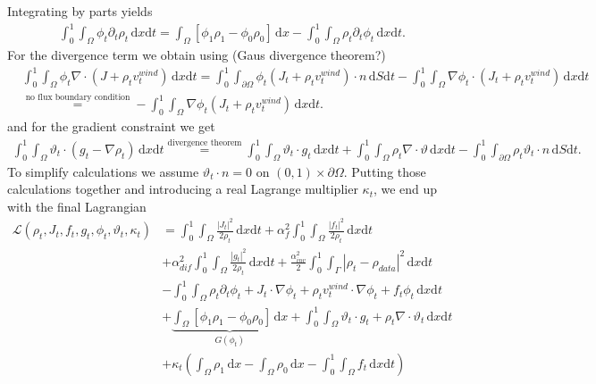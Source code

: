 Integrating by parts yields 
\begin{align*}
	\int_0^1\int_\Omega \phi_t\partial_t\rho_t \,\mathrm{d}x\mathrm{d}t = \int_\Omega[\phi_1\rho_1 - \phi_0\rho_0]\,\mathrm{d}x - \int_0^1\int_\Omega \rho_t\partial_t\phi_t \,\mathrm{d}x\mathrm{d}t.
\end{align*}
For the divergence term we obtain using (Gaus divergence theorem?)
\begin{align*}
	&\int_0^1\int_\Omega \phi_t \nabla \cdot (J + \rho_tv_t^{wind}) \,\mathrm{d}x\mathrm{d}t = \int_0^1\int_{\partial\Omega} \phi_t(J_t + \rho_tv_t^{wind}) \cdot n \,\mathrm{d}S\mathrm{d}t - \int_0^1\int_\Omega \nabla\phi_t \cdot (J_t + \rho_tv_t^{wind}) \,\mathrm{d}x\mathrm{d}t \\&\overset{\text{no flux boundary condition}}{=} - \int_0^1\int_\Omega \nabla\phi_t (J_t + \rho_tv_t^{wind}) \,\mathrm{d}x\mathrm{d}t.
\end{align*}
and for the gradient constraint we get 
\begin{align*}
	\int_0^1\int_\Omega \vartheta_t \cdot (g_t - \nabla\rho_t) \,\mathrm{d}x\mathrm{d}t \overset{\text{divergence theorem}}{=} \int_0^1\int_\Omega \vartheta_t \cdot g_t \,\mathrm{d}x\mathrm{d}t + \int_0^1\int_\Omega \rho_t\nabla \cdot \vartheta \,\mathrm{d}x\mathrm{d}t - \int_0^1\int_{\partial\Omega} \rho_t\vartheta_t \cdot n \,\mathrm{d}S\mathrm{d}t.
\end{align*}
To simplify calculations we assume $\vartheta_t \cdot n = 0$ on $(0,1) \times \partial\Omega$. Putting those calculations together and introducing a real Lagrange multiplier $\kappa_t$, we end up with the final Lagrangian 
\begin{align*}
	\mathcal{L}(\rho_t,J_t, f_t, g_t, \phi_t, \vartheta_t, \kappa_t) &= \int_0^1\int_\Omega\frac{|J_t|^2}{2\rho_t}\,\mathrm{d}x\mathrm{d}t + \alpha_f^2\int_0^1\int_\Omega \frac{|f_t|^2}{2\rho_t}\,\mathrm{d}x\mathrm{d}t \\
																  &+\alpha_{dif}^2\int_0^1\int_\Omega\frac{|g_t|^2}{2\rho_t}\,\mathrm{d}x\mathrm{d}t+\frac{\alpha_{inv}^2}{2} \int_0^1\int_\Gamma|\rho_t-\rho_{data}|^2\,\mathrm{d}x\mathrm{d}t\\
																  &-\int_0^1\int_\Omega \rho_t\partial_t\phi_t + J_t \cdot \nabla\phi_t + \rho_tv_t^{wind} \cdot \nabla\phi_t + f_t\phi_t \,\mathrm{d}x\mathrm{d}t\\
																  &+\underbrace{\int_\Omega [\phi_1\rho_1 - \phi_0\rho_0]\,\mathrm{d}x}_{G(\phi_t)} + \int_0^1\int_\Omega \vartheta_t \cdot g_t + \rho_t\nabla \cdot \vartheta_t \,\mathrm{d}x\mathrm{d}t\\
																  &+\kappa_t\left(\int_\Omega\rho_1\,\mathrm{d}x - \int_\Omega\rho_0\,\mathrm{d}x - \int_0^1\int_\Omega f_t\,\mathrm{d}x\mathrm{d}t\right) %
\end{align*}
